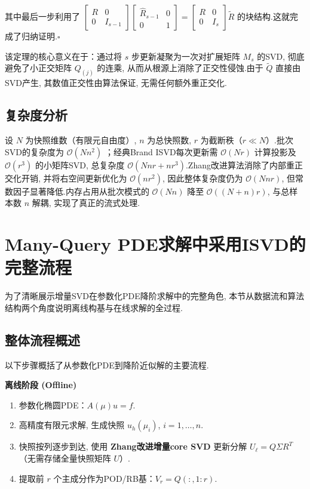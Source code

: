 其中最后一步利用了 $\begin{bmatrix}R & 0\\0 & I_{s-1}\end{bmatrix} \begin{bmatrix} \widehat R_{s-1} & 0 \\ 0 & 1 \end{bmatrix} = \begin{bmatrix}R & 0\\0 & I_s\end{bmatrix} \widetilde R$ 的块结构.这就完成了归纳证明.$\square$

该定理的核心意义在于：通过将 $s$ 步更新凝聚为一次对扩展矩阵 $M_s$ 的SVD, 彻底避免了小正交矩阵 $Q_{(j)}$ 的连乘, 从而从根源上消除了正交性侵蚀.由于 $\widetilde Q$ 直接由SVD产生, 其数值正交性由算法保证, 无需任何额外重正交化.

\subsection{复杂度分析}
设 $N$ 为快照维数（有限元自由度）, $n$ 为总快照数, $r$ 为截断秩（$r\ll N$）.批次SVD的复杂度为 $\mathcal{O}(N n^2)$ \cite{golub2013matrix}；经典Brand ISVD每次更新需 $\mathcal{O}(N r)$ 计算投影及 $\mathcal{O}(r^3)$ 的小矩阵SVD, 总复杂度 $\mathcal{O}(N n r + n r^3)$.Zhang改进算法消除了内部重正交化开销, 并将右空间更新优化为 $\mathcal{O}(n r^2)$, 因此整体复杂度仍为 $\mathcal{O}(N n r)$, 但常数因子显著降低.内存占用从批次模式的 $\mathcal{O}(N n)$ 降至 $\mathcal{O}((N+n)r)$, 与总样本数 $n$ 解耦, 实现了真正的流式处理.

\section{Many-Query PDE求解中采用ISVD的完整流程}
\label{sec:workflow}

为了清晰展示增量SVD在参数化PDE降阶求解中的完整角色, 本节从数据流和算法结构两个角度说明离线构基与在线求解的全过程.

\subsection{整体流程概述}

以下步骤概括了从参数化PDE到降阶近似解的主要流程.

\noindent\textbf{离线阶段 (Offline)}
\begin{enumerate}
    \item 参数化椭圆PDE：$A(\mu)u = f$.
    \item 高精度有限元求解, 生成快照 $u_h(\mu_i)$, $i=1,\dots,n$.
    \item 快照按列逐步到达, 使用 \textbf{Zhang改进增量core SVD} 更新分解 $U_\ell = Q\Sigma R^T$（无需存储全量快照矩阵 $U$）.
    \item 提取前 $r$ 个主成分作为POD/RB基：$V_r = Q(:,1:r)$.
\end{enumerate}

